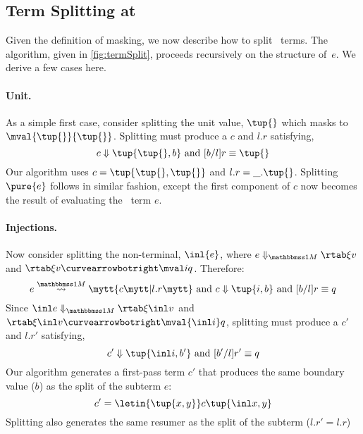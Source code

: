 \begin{abstrsyn}



\subsection{Term Splitting at \bbonem}
\label{sec:split-one}

Given the definition of masking, we now describe how to split
\bbonem\ terms. The algorithm, given in \cref{fig:termSplit}, proceeds
recursively on the structure of~$e$. We derive a few cases here.

\paragraph {Unit.} 
As a simple first case, consider splitting the unit value, $\tup{}$
which masks to $\mval {\tup{}} {\tup{}}$.
Splitting must produce a $c$ and $l.r$ satisfying,
\[
	\reduce c {\tup{\tup{},b}} \text{ and } [b/l]r \equiv \tup{}
\]
Our algorithm uses $c=\tup{\tup{},\tup{}}$ and $l.r = \_.\tup{}$.
Splitting $\pure{e}$ follows in similar fashion, except the first 
component of $c$ now becomes the result of evaluating the \bbonep\ term $e$.

\paragraph {Injections.}
Now consider splitting the non-terminal, $\inl {e}$, where $\diaone
{e} \xi v$ and $\rtab \xi v \vsplito \mval i q$. Therefore:
\[
	\splitone e A c {l.r} \text{ and } \reduce c {\tup{i,b}} \text{ and } [b/l]r \equiv q
\]
Since $\diaone {\inl e} \xi {\inl v}$ and $\rtab \xi {\inl v} \vsplito \mval {\inl i} q$,
splitting must produce a $c'$ and $l.r'$ satisfying,
\[
	\reduce {c'} {\tup{\inl i,b'}} \text{ and } [b'/l]r' \equiv q
\]
Our algorithm generates a first-pass term $c'$ that produces the same
boundary value ($b$) as the split of the subterm $e$:
\[
c' = \letin {\tup {x,y}} c {\tup{\inl x, y}}
\]
Splitting also generates the same resumer as the split of the
subterm ($l.r' = l.r$)


\end{abstrsyn}
